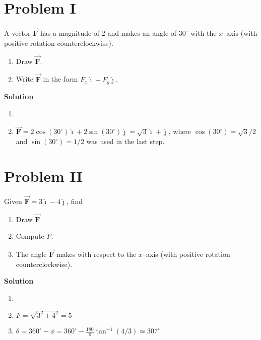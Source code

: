 \documentclass{article}
\newcommand{\ds}[0]{\displaystyle}
\newcommand{\ihat}[0]{\hat{\boldsymbol{\imath}}}
\newcommand{\jhat}[0]{\hat{\boldsymbol{\jmath}}}
\newcommand{\bfvec}[1]{\vec{\mathbf{#1}}}
\begin{document}
\section{Problem I}

A vector $\bfvec{F}$ has a magnitude of $2$ and makes an angle of $30^\circ$ with the $x$--axis (with positive rotation counterclockwise).

\begin{enumerate}

  \item Draw $\bfvec{F}$.

  \item Write $\bfvec{F}$ in the form $F_x\ihat + F_y\jhat$.

\end{enumerate}

\ifsolutions
\textbf{Solution}

    \begin{enumerate}

      \item 

            

      \item $\bfvec{F} = 2\cos(30^\circ)\ihat + 2\sin(30^\circ)\jhat=\sqrt{3}\ihat + \jhat$, where $\cos(30^\circ)=\sqrt{3}/2$ and $\sin(30^\circ)=1/2$ was used in the last step.

    \end{enumerate}
\else


\fi

\section{Problem II}

Given $\bfvec{F}=3\ihat -4\jhat$, find

\begin{enumerate}

  \item Draw $\bfvec{F}$.

  \item Compute $F$.

  \item The angle  $\bfvec{F}$ makes with respect to the $x$--axis (with positive rotation counterclockwise).

\end{enumerate}

\ifsolutions
\textbf{Solution}

    \begin{enumerate}

      \item 

            

      \item $F=\sqrt{3^2+4^2}=5$

      \item $\ds\theta = 360^\circ - \phi = 360^\circ - \frac{180}{\pi}\tan^{-1}(4/3)\simeq 307^\circ$

    \end{enumerate}
\else


\fi
\end{document}
